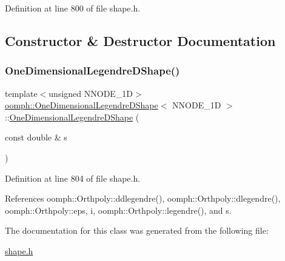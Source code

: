 Definition at line 800 of file shape.\+h.



\subsection{Constructor \& Destructor Documentation}
\mbox{\label{classoomph_1_1OneDimensionalLegendreDShape_a85066e08a63c0c494511fabaee6a684d}} 
\subsubsection{\texorpdfstring{One\+Dimensional\+Legendre\+D\+Shape()}{OneDimensionalLegendreDShape()}}
{\footnotesize\ttfamily template$<$unsigned N\+N\+O\+D\+E\+\_\+1D$>$ \\
\hyperlink{classoomph_1_1OneDimensionalLegendreDShape}{oomph\+::\+One\+Dimensional\+Legendre\+D\+Shape}$<$ N\+N\+O\+D\+E\+\_\+1D $>$\+::\hyperlink{classoomph_1_1OneDimensionalLegendreDShape}{One\+Dimensional\+Legendre\+D\+Shape} (\begin{DoxyParamCaption}\item[{const double \&}]{s }\end{DoxyParamCaption})\hspace{0.3cm}{\ttfamily [inline]}}



Definition at line 804 of file shape.\+h.



References oomph\+::\+Orthpoly\+::ddlegendre(), oomph\+::\+Orthpoly\+::dlegendre(), oomph\+::\+Orthpoly\+::eps, i, oomph\+::\+Orthpoly\+::legendre(), and s.



The documentation for this class was generated from the following file\+:\begin{DoxyCompactItemize}
\item 
\hyperlink{shape_8h}{shape.\+h}\end{DoxyCompactItemize}
